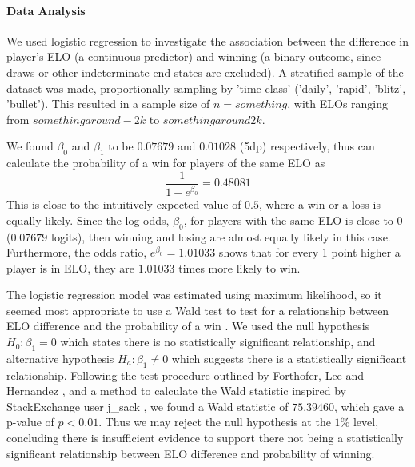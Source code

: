 \documentclass[10pt,a4paper,twocolumn]{article}
\begin{document}

\paragraph{Data Analysis}
We used logistic regression to investigate the association between the difference in player's ELO (a continuous predictor) and winning (a binary outcome, since draws or other indeterminate end-states are excluded).
A stratified sample of the dataset was made, proportionally sampling by 'time class' ('daily', 'rapid', 'blitz', 'bullet'). This resulted in a sample size of $n={something}$, with ELOs ranging from ${something around -2k}$ to ${something around 2k}$.

We found $\beta_{0}$ and $\beta_{1}$ to be $0.07679$ and $0.01028$ (5dp) respectively, thus can calculate the probability of a win for players of the same ELO as 
$$\displaystyle\frac{1}{1+e^{\beta_{0}}} = 0.48081$$
This is close to the intuitively expected value of $0.5$, where a win or a loss is equally likely. Since the log odds, $\beta_{0}$, for players with the same ELO is close to $0$ ($0.07679$ logits), then winning and losing are almost equally likely in this case. Furthermore, the odds ratio, $e^{\beta_{0}} = 1.01033$ shows that for every 1 point higher a player is in ELO, they are $1.01033$ times more likely to win.

The logistic regression model was estimated using maximum likelihood, so it seemed most appropriate to use a Wald test to test for a relationship between ELO difference and the probability of a win \cite{WaldTest}. We used the null hypothesis $H_{0}: \beta_{1} = 0$ which states there is no statistically significant relationship, and alternative hypothesis $H_{a}: \beta_{1} \neq 0$ which suggests there is a statistically significant relationship. Following the test procedure outlined by Forthofer, Lee and Hernandez \cite{WaldTest}, and a method to calculate the Wald statistic inspired by StackExchange user j\_sack \cite{StackExchangeWaldTest}, we found a Wald statistic of $75.39460$, which gave a p-value of $p<0.01$. Thus we may reject the null hypothesis at the $1\%$ level, concluding there is insufficient evidence to support there not being a statistically significant relationship between ELO difference and probability of winning.
\end{document}
